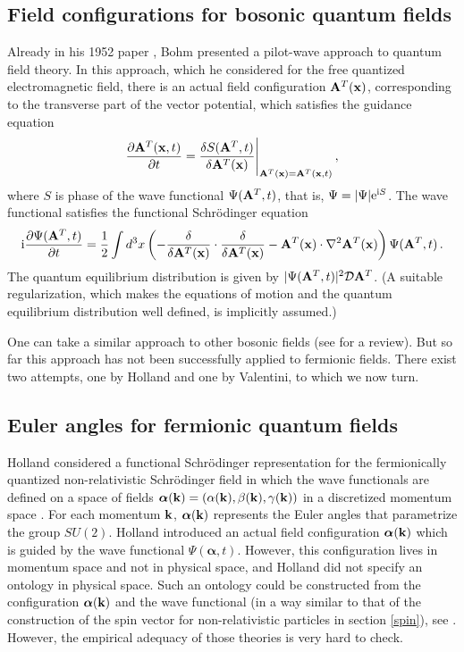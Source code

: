 \documentclass[12pt]{article}
\def\ii{\textrm i}
\def\ee{\textrm e}
\begin{document}
\subsection{Field configurations for bosonic quantum fields}
Already in his 1952 paper \cite{bohm52b}, Bohm presented a pilot-wave approach to quantum field theory. In this approach, which he considered for the free quantized electromagnetic field, there is an actual field configuration ${\bf A}^T({\bf x})$, corresponding to the transverse part of the vector potential, which satisfies the guidance equation
\begin{equation}
\frac{\partial {\bf A}^T ({\bf x},t)}{\partial t} = \frac{\delta S ({\bf A}^T,t)}{\delta {\bf A}^T({\bf x})}\Bigg|_{{\bf A}^T({\bf x}) = {\bf A}^T ({\bf x},t)} \,,
\label{5}
\end{equation}
where $S$ is phase of the wave functional $\Psi({\bf A}^T,t)$, that is, $\Psi = |\Psi|\ee^{\ii S}$. The wave functional satisfies the functional Schr\"odinger equation
\begin{equation}
\ii\frac{\partial \Psi({\bf A}^T,t)}{\partial t} = \frac{1}{2}  \int d^3 x \left( -\frac{\delta}{ \delta {\bf A}^T({\bf x})} \cdot \frac{\delta}{\delta {\bf A}^T({\bf x})} -  {\bf A}^T({\bf x}) \cdot \nabla^2 {\bf A}^T({\bf x})  \right)\Psi({\bf A}^T,t) \,.
\label{6}
\end{equation}
The quantum equilibrium distribution is given by $|\Psi({\bf A}^T,t)|^2 {\mathcal{D}} {\bf A}^T$. (A suitable regularization, which makes the equations of motion and the quantum equilibrium distribution well defined, is implicitly assumed.)

One can take a similar approach to other bosonic fields (see \cite{struyve10} for a review). But so far this approach has not been successfully applied to fermionic fields. There exist two attempts, one by Holland and one by Valentini, to which we now turn. 

\subsection{Euler angles for fermionic quantum fields}
Holland considered a functional Schr\"odinger representation for the fermionically quantized non-relativistic Schr\"odinger field in which the wave functionals are defined on a space of fields ${\boldsymbol{\alpha}}({\bf k}) = (\alpha({\bf k}),\beta({\bf k}),\gamma({\bf k}))$ in a discretized momentum space \cite{holland881,holland93b}. For each momentum ${\bf k}$, ${\boldsymbol \alpha}({\bf k})$ represents the Euler angles that parametrize the group $SU(2)$. Holland introduced an actual field configuration ${\boldsymbol{\alpha}}({\bf k})$ which is guided by the wave functional $\Psi({\boldsymbol{\alpha}},t)$. However, this configuration lives in momentum space and not in physical space, and Holland did not specify an ontology in physical space. Such an ontology could be constructed from the configuration ${\boldsymbol \alpha}({\bf k})$ and the wave functional (in a way similar to that of the construction of the spin vector for non-relativistic particles in section \ref{spin}), see \cite{struyve10}. However, the empirical adequacy of those theories is very hard to check. 
\end{document}

